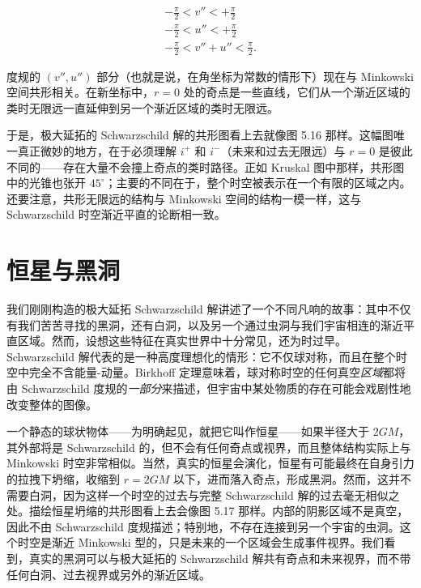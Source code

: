 \begin{gather*}
-\frac{\pi}{2} < v'' < +\frac{\pi}{2}\\
-\frac{\pi}{2} < u'' < +\frac{\pi}{2}\\
-\frac{\pi}{2} < v'' + u'' < \frac{\pi}{2}.
\end{gather*}


度规的 $(v'', u'')$ 部分（也就是说，在角坐标为常数的情形下）现在与 Minkowski 空间共形相关。在新坐标中，$r=0$ 处的奇点是一些直线，它们从一个渐近区域的类时无限远一直延伸到另一个渐近区域的类时无限远。

于是，极大延拓的 Schwarzschild 解的共形图看上去就像图 5.16 那样。这幅图唯一真正微妙的地方，在于必须理解 $i^+$ 和 $i^-$（未来和过去无限远）与 $r=0$ 是彼此不同的——存在大量不会撞上奇点的类时路径。正如 Kruskal 图中那样，共形图中的光锥也张开 $45^{\circ}$；主要的不同在于，整个时空被表示在一个有限的区域之内。还要注意，共形无限远的结构与 Minkowski 空间的结构一模一样，这与 Schwarzschild 时空渐近平直的论断相一致。

\section{恒星与黑洞}

我们刚刚构造的极大延拓 Schwarzschild 解讲述了一个不同凡响的故事：其中不仅有我们苦苦寻找的黑洞，还有白洞，以及另一个通过虫洞与我们宇宙相连的渐近平直区域。然而，设想这些特征在真实世界中十分常见，还为时过早。Schwarzschild 解代表的是一种高度理想化的情形：它不仅球对称，而且在整个时空中完全不含能量-动量。Birkhoff 定理意味着，球对称时空的任何真空\emph{区域}都将由 Schwarzschild 度规的\emph{一部分}来描述，但宇宙中某处物质的存在可能会戏剧性地改变整体的图像。

一个静态的球状物体——为明确起见，就把它叫作恒星——如果半径大于 $2GM$，其外部将是 Schwarzschild 的，但不会有任何奇点或视界，而且整体结构实际上与 Minkowski 时空非常相似。当然，真实的恒星会演化，恒星有可能最终在自身引力的拉拽下坍缩，收缩到 $r=2GM$ 以下，进而落入奇点，形成黑洞。然而，这并不需要白洞，因为这样一个时空的过去与完整 Schwarzschild 解的过去毫无相似之处。描绘恒星坍缩的共形图看上去会像图 5.17 那样。内部的阴影区域不是真空，因此不由 Schwarzschild 度规描述；特别地，不存在连接到另一个宇宙的虫洞。这个时空是渐近 Minkowski 型的，只是未来的一个区域会生成事件视界。我们看到，真实的黑洞可以与极大延拓的 Schwarzschild 解共有奇点和未来视界，而不带任何白洞、过去视界或另外的渐近区域。

